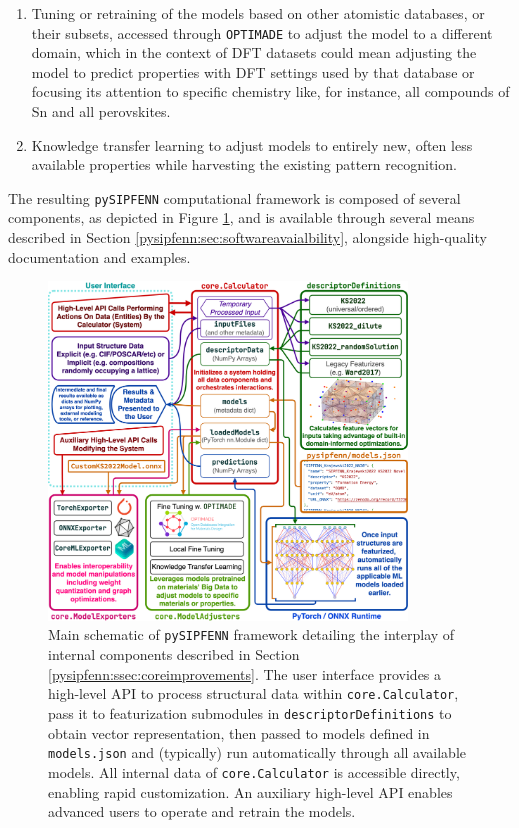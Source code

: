 \begin{enumerate}
\begin{enumerate}
        \item Tuning or retraining of the models based on other atomistic databases, or their subsets, accessed through \texttt{OPTIMADE} \cite{Andersen2021OPTIMADEData, Evans2024DevelopmentsExchange} to adjust the model to a different domain, which in the context of DFT datasets could mean adjusting the model to predict properties with DFT settings used by that database or focusing its attention to specific chemistry like, for instance, all compounds of Sn and all perovskites.
        
        \item Knowledge transfer learning \cite{Torrey2010HandbookLearning} to adjust models to entirely new, often less available properties while harvesting the existing pattern recognition.
    \end{enumerate}    
\end{enumerate}

The resulting \texttt{pySIPFENN} computational framework is composed of several components, as depicted in Figure \ref{pysipfenn:fig:pySIPFENNMainSchematic}, and is available through several means described in Section \ref{pysipfenn:sec:softwareavaialbility}, alongside high-quality documentation and examples.

\begin{figure}[h!]
    \centering
    \includegraphics[width=0.85\textwidth]{pySIPFENN_MainSchematic.png}
    \caption{Main schematic of \texttt{pySIPFENN} framework detailing the interplay of internal components described in Section \ref{pysipfenn:ssec:coreimprovements}. The user interface provides a high-level API to process structural data within \texttt{core.Calculator}, pass it to featurization submodules in \texttt{descriptorDefinitions} to obtain vector representation, then passed to models defined in \texttt{models.json} and (typically) run automatically through all available models. All internal data of \texttt{core.Calculator} is accessible directly, enabling rapid customization. An auxiliary high-level API enables advanced users to operate and retrain the models.}
    \label{pysipfenn:fig:pySIPFENNMainSchematic}
\end{figure}


